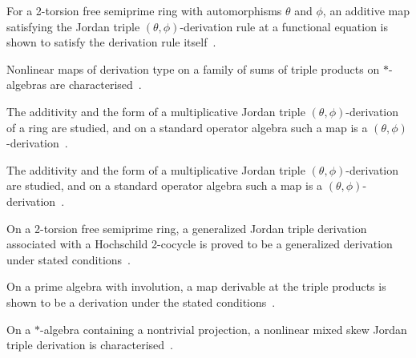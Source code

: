 For a 2-torsion free semiprime ring with automorphisms $\theta$ and $\phi$, an additive map satisfying the Jordan triple $(\theta,\phi)$-derivation rule at a functional equation is shown to satisfy the derivation rule itself~\cite{WlOnCertainFunctional2011}.

Nonlinear maps of derivation type on a family of sums of triple products on $*$-algebras are characterised~\cite{WlNonlinearMapsOf2023}.

The additivity and the form of a multiplicative Jordan triple $(\theta,\phi)$-derivation of a ring are studied, and on a standard operator algebra such a map is a $(\theta,\phi)$-derivation~\cite{WlMultiplicativeJordanTriple2020}.

The additivity and the form of a multiplicative Jordan triple $(\theta,\phi)$-derivation are studied, and on a standard operator algebra such a map is a $(\theta,\phi)$-derivation~\cite{WlMultiplicativeJordanTripleThet2025}.

On a 2-torsion free semiprime ring, a generalized Jordan triple derivation associated with a Hochschild 2-cocycle is proved to be a generalized derivation under stated conditions~\cite{WlGeneralizedJordanTripleDerivat2024}.

On a prime algebra with involution, a map derivable at the triple products is shown to be a derivation under the stated conditions~\cite{WlTripleDerivableMapsOnPrimeAlge2020}.

On a $*$-algebra containing a nontrivial projection, a nonlinear mixed skew Jordan triple derivation is characterised~\cite{WlCharacterizationOfNonlinearMix2020}.

